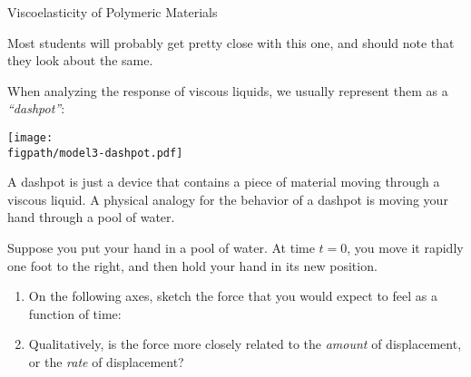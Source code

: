 \begin{activity}{Viscoelasticity of Polymeric Materials}
\begin{ctqs}
\begin{enumerate}
				\begin{solution}[2in]
					Most students will probably get pretty close with this one, and should note that they look about the same.
				\end{solution}
		\end{enumerate}
\end{ctqs}

\clearpage
\begin{model}

	When analyzing the response of viscous liquids, we usually represent them as a \emph{``dashpot''}:
	
	\vspace{3pt}
	\centerline{\texttt{[image: \\figpath/model3-dashpot.pdf]}}
	
	A dashpot is just a device that contains a piece of material moving through a viscous liquid. A physical analogy for the behavior of a dashpot is moving your hand through a pool of water.
	
\end{model}

\begin{ctqs}
	
	\question  Suppose you put your hand in a pool of water. At time $t=0$, you move it rapidly one foot to the right, and then hold your hand in its new position.\label{\labelbase:ctq:poolstepstrain}
	
		\begin{enumerate}
			\item On the following axes, sketch the force that you would expect to feel as a function of time:
			
				\begin{solution}[1.5in]
				\end{solution}
			
			\item Qualitatively, is the force more closely related to the \emph{amount} of displacement, or the \emph{rate} of displacement?
			

\end{enumerate}
\end{ctqs}
\end{activity}
